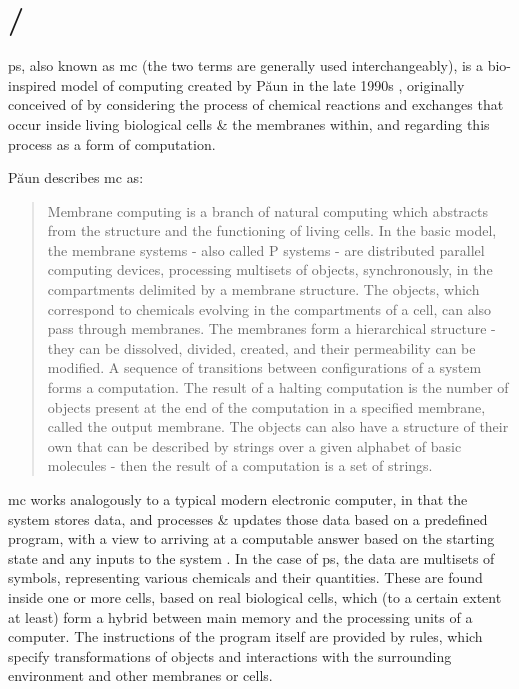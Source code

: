 \section{/}
\gls{ps}, also known as \gls{mc} (the two terms are generally used interchangeably), is a bio-inspired model of computing created by Păun in the late 1990s \cite{tPaun98a,Paun2000}, originally conceived of by considering the process of chemical reactions and exchanges that occur inside living biological cells \& the membranes within, and regarding this process as a form of computation.

Păun describes \gls{mc} \cite[p.~VII]{Paun2002} as:
\begin{quote}
Membrane computing is a branch of natural computing which abstracts from
the structure and the functioning of living cells. In the basic model, the membrane
systems - also called P systems - are distributed parallel computing
devices, processing multisets of objects, synchronously, in the compartments
delimited by a membrane structure. The objects, which correspond to chemicals
evolving in the compartments of a cell, can also pass through membranes.
The membranes form a hierarchical structure - they can be dissolved, divided,
created, and their permeability can be modified. A sequence of transitions between
configurations of a system forms a computation. The result of a halting
computation is the number of objects present at the end of the computation
in a specified membrane, called the output membrane. The objects can also
have a structure of their own that can be described by strings over a given
alphabet of basic molecules - then the result of a computation is a set of
strings.
\end{quote}

\Gls{mc} works analogously to a typical modern electronic computer, in that the system stores data, and processes \& updates those data based on a predefined program, with a view to arriving at a computable answer based on the starting state and any inputs to the system \cite{Paun2002,Paun2010b}.  In the case of \gls{ps}, the data are multisets of symbols, representing various chemicals and their quantities.  These are found inside one or more cells, based on real biological cells, which (to a certain extent at least) form a hybrid between main memory and the processing units of a computer.  The instructions of the program itself are provided by rules, which specify transformations of objects and interactions with the surrounding environment and other membranes or cells.

